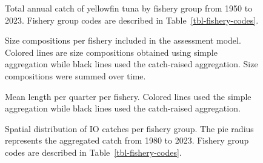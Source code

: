 \documentclass[
]{scrartcl}
\begin{document}
\newpage{}

\begin{figure}


\caption{\label{fig-catch-bar}Total annual catch of yellowfin tuna by
fishery group from 1950 to 2023. Fishery group codes are described in
Table~\ref{tbl-fishery-codes}.}

\end{figure}%

\newpage{}

\begin{figure}


\caption{\label{fig-agg-size}Size compositions per fishery included in
the assessment model. Colored lines are size compositions obtained using
simple aggregation while black lines used the catch-raised aggregation.
Size compositions were summed over time.}

\end{figure}%

\newpage{}

\begin{figure}


\caption{\label{fig-mlen}Mean length per quarter per fishery. Colored
lines used the simple aggregation while black lines used the
catch-raised aggregation.}

\end{figure}%

\newpage{}

\begin{figure}


\caption{\label{fig-catch-grid}Spatial distribution of IO catches per
fishery group. The pie radius represents the aggregated catch from 1980
to 2023. Fishery group codes are described in
Table~\ref{tbl-fishery-codes}.}

\end{figure}%
\end{document}

